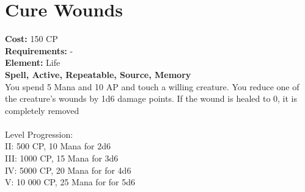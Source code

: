 \section{Cure Wounds}
\textbf{Cost:} 150 CP\\
\textbf{Requirements:} -\\
\textbf{Element:} Life\\
\textbf{Spell, Active, Repeatable, Source, Memory}\\
You spend 5 Mana and 10 AP and touch a willing creature. You reduce one of the creature's wounds by 1d6 damage points. If the wound is healed to 0, it is completely removed\\
\\
Level Progression:\\
II: 500 CP, 10 Mana for 2d6\\
III: 1000 CP, 15 Mana for 3d6\\
IV: 5000 CP, 20 Mana for for 4d6\\
V: 10 000 CP, 25 Mana for for 5d6\\